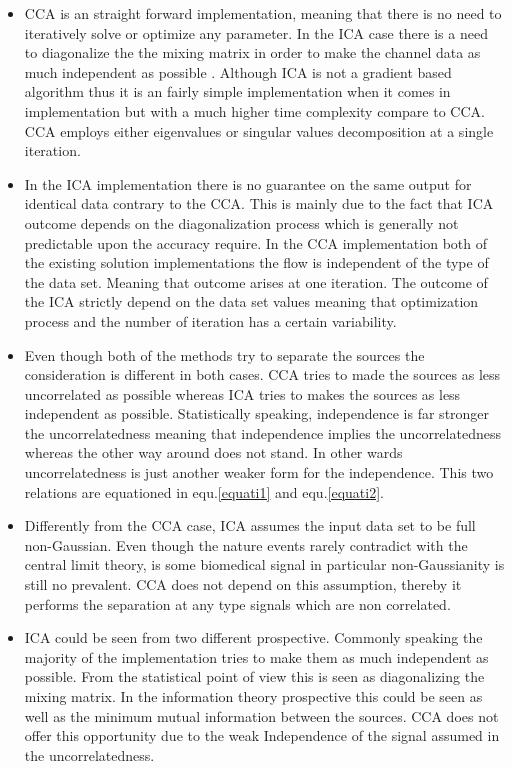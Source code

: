 \begin{itemize}
\item CCA is an straight forward implementation, meaning that there is no need to iteratively solve or optimize any parameter. In the ICA case there is a need to diagonalize the the mixing matrix in order to make the channel data as much independent as possible \cite{15}. Although ICA is not a gradient based algorithm thus it is an fairly simple implementation when it comes in implementation but with a much higher time complexity compare to CCA. CCA employs either eigenvalues or singular values decomposition at a single iteration.  

\item In the ICA implementation there is no guarantee on the same output for identical data contrary to the CCA. This is mainly due to the fact that ICA outcome depends on the diagonalization process which is generally not predictable upon the accuracy require. In the CCA implementation both of the existing solution implementations\cite{16} the flow is independent of the type of the data set. Meaning that outcome arises at one iteration. The outcome of the ICA strictly depend on the data set values meaning that optimization process and the number of iteration has a certain variability. 

\item Even though both of the methods try to separate the sources the consideration is different in both cases. CCA tries to made the sources as less uncorrelated as possible whereas ICA tries to makes the sources as less independent as possible. Statistically speaking, independence is far stronger the uncorrelatedness meaning that independence implies the uncorrelatedness whereas the other way around does not stand. In other wards uncorrelatedness is just another weaker form for the independence\cite{15}. This two relations are equationed in equ.\ref{equati1} and equ.\ref{equati2}.

\item Differently from the CCA case, ICA assumes the input data set to be full non-Gaussian\cite{15}. Even though the nature events rarely contradict with the central limit theory, is some biomedical signal in particular non-Gaussianity is still no prevalent. CCA does not depend on this assumption, thereby it performs the separation at any type signals which are non correlated.

\item ICA could be seen from two different prospective. Commonly speaking the majority of the implementation tries to make them as much independent as possible. From the statistical point of view this is seen as diagonalizing the mixing matrix. In the information theory prospective this could be seen as well as the minimum mutual information between the sources\cite{15}. CCA does not offer this opportunity due to the weak Independence of the signal assumed in the uncorrelatedness.   


\end{itemize}
